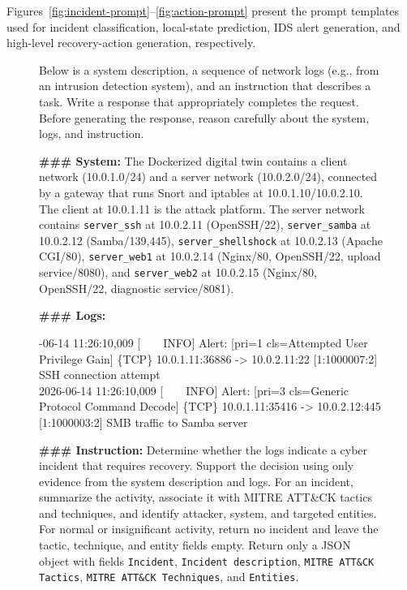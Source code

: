 \documentclass[sigconf]{acmart}
\begin{document}
Figures~\ref{fig:incident-prompt}--\ref{fig:action-prompt} present the prompt
templates used for incident classification, local-state prediction, IDS alert generation, and high-level recovery-action generation, respectively.

\begin{figure}
\centering
\begin{tcolorbox}[
  title=Incident Classification Prompt Template,
  colback=Purple!5,
  colframe=Purple!60,
  boxrule=0.5pt,
  arc=2pt,
  left=5pt,
  right=5pt,
  top=5pt,
  bottom=5pt]
\footnotesize
Below is a system description, a sequence of network logs (e.g., from an
intrusion detection system), and an instruction that describes a task. Write a
response that appropriately completes the request. Before generating the
response, reason carefully about the system, logs, and instruction.

\textbf{\#\#\# System:} The Dockerized digital twin contains a client network (10.0.1.0/24) and a server network (10.0.2.0/24), connected by a gateway that runs Snort and iptables at 10.0.1.10/10.0.2.10. The client at 10.0.1.11 is the attack platform. The server network contains \texttt{server\_ssh} at 10.0.2.11 (OpenSSH/22), \texttt{server\_samba} at 10.0.2.12 (Samba/139,445), \texttt{server\_shellshock} at 10.0.2.13 (Apache CGI/80), \texttt{server\_web1} at 10.0.2.14 (Nginx/80, OpenSSH/22, upload service/8080), and \texttt{server\_web2} at 10.0.2.15 (Nginx/80, OpenSSH/22, diagnostic service/8081).

\textbf{\#\#\# Logs:}\par
{\ttfamily\scriptsize\raggedright{}-06-14 11:26:10,009 [\ \ \ \ INFO] Alert: [pri=1 cls=Attempted User
Privilege Gain] \{TCP\} 10.0.1.11:36886 -> 10.0.2.11:22 [1:1000007:2] SSH
connection attempt\\[2pt]
2026-06-14 11:26:10,009 [\ \ \ \ INFO] Alert: [pri=3 cls=Generic Protocol
Command Decode] \{TCP\} 10.0.1.11:35416 -> 10.0.2.12:445 [1:1000003:2]
SMB traffic to Samba server}


\textbf{\#\#\# Instruction:}
Determine whether the logs indicate a cyber incident that requires recovery. Support the decision using only evidence from the system description and logs. For an incident, summarize the activity, associate it with MITRE ATT\&CK tactics and techniques, and identify attacker, system, and targeted entities. For normal or insignificant activity, return no incident and leave the tactic, technique, and entity fields empty. Return only a JSON object with fields
\texttt{Incident}, \texttt{Incident description},
\texttt{MITRE ATT\&CK Tactics}, \texttt{MITRE ATT\&CK Techniques}, and \texttt{Entities}.


\end{tcolorbox}
\end{figure}
\end{document}
